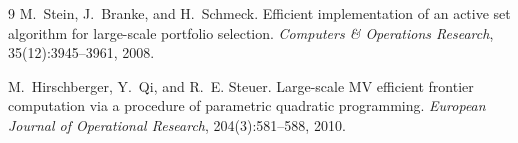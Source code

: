 \documentclass[11pt]{article}
\begin{document}
\begin{thebibliography}{9}
M.~Stein, J.~Branke, and H.~Schmeck.
\newblock Efficient implementation of an active set algorithm for large-scale
portfolio selection.
\newblock \emph{Computers \& Operations Research}, 35(12):3945--3961, 2008.

M.~Hirschberger, Y.~Qi, and R.~E. Steuer.
\newblock Large-scale MV efficient frontier computation via a procedure of
parametric quadratic programming.
\newblock \emph{European Journal of Operational Research}, 204(3):581--588, 2010.

\end{thebibliography}
\end{document}

